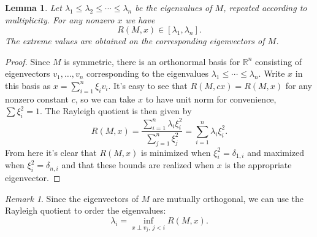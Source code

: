 \documentclass[11pt,letterpaper]{article}
\newcommand{\reals}{\mathbb{R}}
\newtheorem{lemma}[theorem]{Lemma}
\theoremstyle{definition}
\theoremstyle{remark}
\newtheorem{remark}{Remark}[section]
\begin{document}
\begin{lemma}
	Let $\lambda_1 \leq \lambda_2 \leq \cdots \leq \lambda_n$ be the eigenvalues of $M$, repeated according to multiplicity. For any nonzero $x$ we have
	\[
	R(M, x)\in [\lambda_1, \lambda_n].
	\]
	The extreme values are obtained on the corresponding eigenvectors of $M$.
\end{lemma}

\begin{proof}
	Since $M$ is symmetric, there is an orthonormal basis for $\reals^n$ consisting of eigenvectors $v_1, \ldots, v_n$ corresponding to the eigenvalues $\lambda_1 \leq \cdots \leq \lambda_n$. Write $x$ in this basis as $x = \sum_{i=1}^n \xi_iv_i$. It's easy to see that $R(M, cx) = R(M, x)$ for any nonzero constant $c$, so we can take $x$ to have unit norm for convenience, $\sum \xi_i^2 = 1$. The Rayleigh quotient is then given by
	\[
	R(M, x) = \frac{\sum_{i=1}^n\lambda_i\xi_i^2}{\sum_{j=1}^n\xi_j^2} = \sum_{i=1}^n\lambda_i\xi_i^2.
	\]
	From here it's clear that $R(M,x)$ is minimized when $\xi_i^2 = \delta_{1, i}$ and maximized when $\xi_i^2 = \delta_{n, i}$ and that these bounds are realized when $x$ is the appropriate eigenvector.
\end{proof}

\begin{remark}
	Since the eigenvectors of $M$ are mutually orthogonal, we can use the Rayleigh quotient to order the eigenvalues:
	\[
	\lambda_i = \inf_{x\perp v_j,\ j<i}R(M, x).
	\]
\end{remark}
\end{document}
